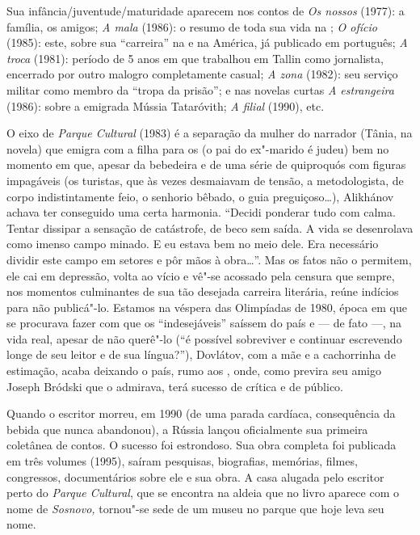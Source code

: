 Sua infância/juventude/maturidade aparecem nos contos de \emph{Os
nossos} (1977): a família, os amigos; \emph{A mala} (1986): o resumo
de toda sua vida na ; \emph{O ofício} (1985): este, sobre sua
``carreira'' na  e na América, já publicado em português; \emph{A troca} (1981): período
de 5 anos em que trabalhou em Tallin como jornalista, encerrado por
outro malogro completamente casual; \emph{A zona} (1982): seu serviço
militar como membro da ``tropa da prisão''; e nas novelas curtas
\emph{A estrangeira} (1986): sobre a emigrada Mússia Tataróvith; \emph{A filial} (1990), etc.

O eixo de \emph{Parque Cultural} (1983) é a separação da mulher do
narrador (Tânia, na novela) que emigra com a filha para os  (o pai do
ex"-marido é judeu) bem no momento em que, apesar da bebedeira e de uma
série de quiproquós com figuras impagáveis (os turistas, que às vezes
desmaiavam de tensão, a metodologista, de corpo indistintamente feio, o
senhorio bêbado, o guia preguiçoso\ldots{}), Alikhánov achava ter conseguido
uma certa harmonia. ``Decidi ponderar tudo com calma. Tentar dissipar a
sensação de catástrofe, de beco sem saída. A vida se desenrolava como
imenso campo minado. E eu estava bem no meio dele. Era necessário
dividir este campo em setores e pôr mãos à obra\ldots{}''. Mas os fatos não o
permitem, ele cai em depressão, volta ao vício e vê"-se acossado pela
censura que sempre, nos momentos culminantes de sua tão desejada
carreira literária, reúne indícios para não publicá"-lo. Estamos na
véspera das Olimpíadas de 1980, época em que se procurava fazer com que
os ``indesejáveis'' saíssem do país e --- de fato ---, na vida real,
apesar de não querê"-lo (``é possível sobreviver e continuar escrevendo
longe de seu leitor e de sua língua?''), Dovlátov, com a mãe e a
cachorrinha de estimação, acaba deixando o país, rumo aos , onde, como
previra seu amigo Joseph Bródski que o admirava, terá sucesso de crítica
e de público.

Quando o escritor morreu, em 1990 (de uma parada cardíaca, consequência
da bebida que nunca abandonou), a Rússia lançou oficialmente sua
primeira coletânea de contos. O sucesso foi estrondoso. Sua obra
completa foi publicada em três volumes (1995), saíram pesquisas,
biografias, memórias, filmes, congressos, documentários sobre ele e sua
obra. A casa alugada pelo escritor perto do \emph{Parque Cultural}, que
se encontra na aldeia que no livro aparece com o nome de \emph{Sosnovo,}
tornou"-se sede de um museu no parque que hoje leva seu nome.

